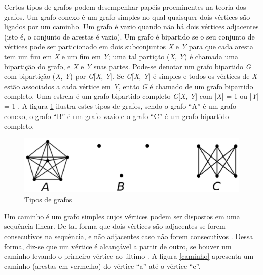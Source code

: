 \begin{apendicesenv}
Certos tipos de grafos podem desempenhar papéis proeminentes na teoria dos grafos. Um grafo conexo é um grafo simples no qual quaisquer dois vértices são ligados por um caminho. Um grafo é vazio quando não há dois vértices adjacentes (isto é, o conjunto de arestas é vazio). Um grafo é bipartido se o seu conjunto de vértices pode ser particionado em dois subconjuntos \textit{X} e \textit{Y} para que cada aresta tem um fim em \textit{X} e um fim em \textit{Y}; uma tal partição (\textit{X}, \textit{Y}) é chamada uma bipartição do grafo, e \textit{X} e \textit{Y} suas partes. Pode-se denotar um grafo bipartido \textit{G} com bipartição (\textit{X}, \textit{Y}) por \textit{G}[\textit{X}, \textit{Y}]. Se \textit{G}[\textit{X}, \textit{Y}] é simples e todos os vértices de \textit{X} estão associados a cada vértice em \textit{Y}, então \textit{G} é chamado de um grafo bipartido completo. Uma estrela é um grafo bipartido completo \textit{G}[\textit{X}, \textit{Y}] com |\textit{X}| = 1 ou |\textit{Y}| = 1 \cite{Diestel:1997}.  A figura \ref{tipos_grafos} ilustra estes tipos de grafos, sendo o grafo ``A'' é um grafo conexo, o grafo ``B'' é um grafo vazio e o grafo ``C'' é um grafo bipartido completo.

\begin{figure}[!h]
	\centering
	\includegraphics[scale=0.4]{figuras/referencial_teorico/tipos_grafos.eps}
	\caption[Tipos de grafos]{Tipos de grafos \cite{Diestel:1997}}
	\label{tipos_grafos}
\end{figure}

Um caminho é um grafo simples cujos vértices podem ser dispostos em uma sequência linear. De tal forma que dois vértices são adjacentes se forem consecutivos na sequência, e não adjacentes caso não forem consecutivos \cite{Bondy:2007}. Dessa forma, diz-se que um vértice é alcançável a partir de outro, se houver um caminho levando o primeiro vértice ao último \cite{Costa:2011}. A figura \ref{caminho} apresenta um caminho (arestas em vermelho) do vértice ``a'' até o vértice ``e''.


\end{apendicesenv}
